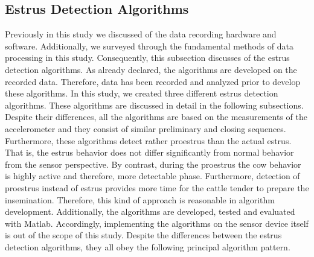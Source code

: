 \documentclass[english,12pt,a4paper,pdftex,elec,utf8]{aaltothesis}
\begin{document}
\subsection{Estrus Detection Algorithms} \label{estrusdetectionalgorithmssection}

Previously in this study we discussed of the data recording hardware and software. Additionally, we surveyed through the fundamental methods of data processing in this study. Consequently, this subsection discusses of the estrus detection algorithms. As already declared, the algorithms are developed on the recorded data. Therefore, data has been recorded and analyzed prior to develop these algorithms. In this study, we created three different estrus detection algorithms. These algorithms are discussed in detail in the following subsections. Despite their differences, all the algorithms are based on the measurements of the accelerometer and they consist of similar preliminary and closing sequences. Furthermore, these algorithms detect rather proestrus than the actual estrus. That is, the estrus behavior does not differ significantly from normal behavior from the sensor perspective. By contrast, during the proestrus the cow behavior is highly active and therefore, more detectable phase. Furthermore, detection of proestrus instead of estrus provides more time for the cattle tender to prepare the insemination. Therefore, this kind of approach is reasonable in algorithm development. Additionally, the algorithms are developed, tested and evaluated with Matlab. Accordingly, implementing the algorithms on the sensor device itself is out of the scope of this study. Despite the differences between the estrus detection algorithms, they all obey the following principal algorithm pattern.
  
\end{document}
